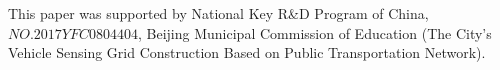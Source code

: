 \documentclass[journal]{IEEEtran}
\begin{document}
This paper was supported by National Key R\&D Program of China, $NO.2017YFC0804404$, Beijing Municipal Commission of Education (The City's Vehicle Sensing Grid Construction Based on Public Transportation Network).


\ifCLASSOPTIONcaptionsoff
  \newpage
\fi




\end{document}
